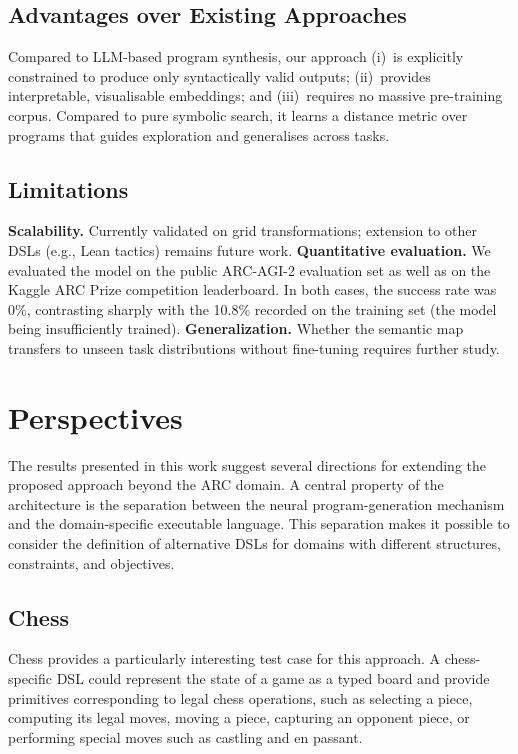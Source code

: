 \documentclass[final]{nesy2027}
\begin{document}
\subsection{Advantages over Existing Approaches}

Compared to LLM-based program synthesis, our approach (i)~is explicitly
constrained to produce only syntactically valid outputs; (ii)~provides
interpretable, visualisable embeddings; and (iii)~requires no massive
pre-training corpus.
Compared to pure symbolic search, it learns a distance metric over programs that
guides exploration and generalises across tasks.

\subsection{Limitations}

\textbf{Scalability.} Currently validated on grid transformations; extension to
other DSLs (e.g., Lean tactics) remains future work.
\textbf{Quantitative evaluation.} We evaluated the model on the public ARC-AGI-2 evaluation 
set as well as on the Kaggle ARC Prize competition leaderboard. In both cases, the success 
rate was 0\%, contrasting sharply with the 10.8\% recorded on the training set (the model being 
insufficiently trained).
\textbf{Generalization.} Whether the semantic map transfers to unseen task
distributions without fine-tuning requires further study.

\section{Perspectives}
\label{sec:perspectives}

The results presented in this work suggest several directions for extending
the proposed approach beyond the ARC domain. A central property of the
architecture is the separation between the neural program-generation
mechanism and the domain-specific executable language. This separation makes
it possible to consider the definition of alternative DSLs for domains with
different structures, constraints, and objectives.

\subsection{Chess}
\label{subsec:perspectives-chess}

Chess provides a particularly interesting test case for this approach. A
chess-specific DSL could represent the state of a game as a typed board and
provide primitives corresponding to legal chess operations, such as selecting
a piece, computing its legal moves, moving a piece, capturing an opponent
piece, or performing special moves such as castling and en passant.
\end{document}
